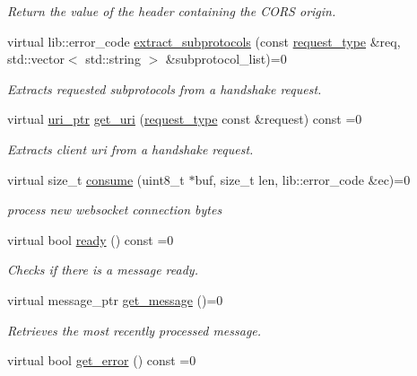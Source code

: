 \begin{DoxyCompactItemize}
\begin{DoxyCompactList}\small\item\em Return the value of the header containing the C\+O\+RS origin. \end{DoxyCompactList}\item 
virtual lib\+::error\+\_\+code \hyperlink{classwebsocketpp_1_1processor_1_1processor_abec64a667b46855187d821abcb7a5247}{extract\+\_\+subprotocols} (const \hyperlink{classwebsocketpp_1_1http_1_1parser_1_1request}{request\+\_\+type} \&req, std\+::vector$<$ std\+::string $>$ \&subprotocol\+\_\+list)=0
\begin{DoxyCompactList}\small\item\em Extracts requested subprotocols from a handshake request. \end{DoxyCompactList}\item 
virtual \hyperlink{namespacewebsocketpp_aae370ea5ac83a8ece7712cb39fc23f5b}{uri\+\_\+ptr} \hyperlink{classwebsocketpp_1_1processor_1_1processor_a8c47ebd7cbf55544b8bc4178dd97a140}{get\+\_\+uri} (\hyperlink{classwebsocketpp_1_1http_1_1parser_1_1request}{request\+\_\+type} const \&request) const =0\hypertarget{classwebsocketpp_1_1processor_1_1processor_a8c47ebd7cbf55544b8bc4178dd97a140}{}\label{classwebsocketpp_1_1processor_1_1processor_a8c47ebd7cbf55544b8bc4178dd97a140}

\begin{DoxyCompactList}\small\item\em Extracts client uri from a handshake request. \end{DoxyCompactList}\item 
virtual size\+\_\+t \hyperlink{classwebsocketpp_1_1processor_1_1processor_a14cb7ee9cd5fa60353ba198f1d3d06c5}{consume} (uint8\+\_\+t $\ast$buf, size\+\_\+t len, lib\+::error\+\_\+code \&ec)=0
\begin{DoxyCompactList}\small\item\em process new websocket connection bytes \end{DoxyCompactList}\item 
virtual bool \hyperlink{classwebsocketpp_1_1processor_1_1processor_a623344489598696c98cecebb03c18333}{ready} () const =0
\begin{DoxyCompactList}\small\item\em Checks if there is a message ready. \end{DoxyCompactList}\item 
virtual message\+\_\+ptr \hyperlink{classwebsocketpp_1_1processor_1_1processor_afb9477aa9e49a7dca59d684277b66932}{get\+\_\+message} ()=0
\begin{DoxyCompactList}\small\item\em Retrieves the most recently processed message. \end{DoxyCompactList}\item 
virtual bool \hyperlink{classwebsocketpp_1_1processor_1_1processor_ac3767ec87d3d538c429156295edd5144}{get\+\_\+error} () const =0\hypertarget{classwebsocketpp_1_1processor_1_1processor_ac3767ec87d3d538c429156295edd5144}{}\label{classwebsocketpp_1_1processor_1_1processor_ac3767ec87d3d538c429156295edd5144}


\end{DoxyCompactItemize}
